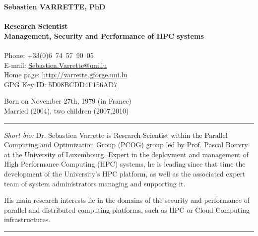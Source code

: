 \documentclass{cv}
\begin{document}
\begin{chapeau}
  \begin{adresse}
    {\Large\textbf{Sebastien VARRETTE, PhD}}\\
    \ligne\\
    \textbf{Research Scientist}\\
    \textbf{Management, Security and Performance of HPC systems}\\
    \ligne\\
    Phone: +33(0)6~74~57~90~05\\
    E-mail:    \url{Sebastien.Varrette@uni.lu}\\
    Home page: \url{http://varrette.gforge.uni.lu}\\
    GPG Key ID: \href{https://pgp.mit.edu/pks/lookup?op=vindex&search=0x5D08BCDD4F156AD7}{5D08BCDD4F156AD7}
  \end{adresse}
  \begin{etatcivil}

    Born on November 27th, 1979 (in France)\\
    Married (2004), two children (2007,2010)\\
  \end{etatcivil}
\end{chapeau}
\vspace*{0.5em}
\noindent\rule{\textwidth}{0.4pt}

\emph{Short bio:}
Dr. Sebastien Varrette is Research Scientist within the Parallel Computing and
Optimization Group (\href{http://pcog.uni.lu}{PCOG}) group led by Prof. Pascal
Bouvry  at the University of Luxembourg.
Expert in the deployment and management of High Performance Computing (HPC)
systems, he is leading since that time the development of the University's HPC
platform, as well as the associated expert team of system administrators
managing and supporting it.

His main research interests lie in the domains of the security and performance
of parallel and distributed computing platforms, such as HPC or Cloud Computing
infrastructures.


\noindent\rule{\textwidth}{0.4pt}
\end{document}
